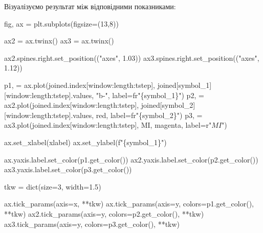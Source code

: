 \documentclass[
  letterpaper,
]{report}
\newenvironment{Shaded}{\begin{snugshade}}{\end{snugshade}}
\newcommand{\BuiltInTok}[1]{\textcolor[rgb]{0.00,0.23,0.31}{#1}}
\newcommand{\DecValTok}[1]{\textcolor[rgb]{0.68,0.00,0.00}{#1}}
\newcommand{\FloatTok}[1]{\textcolor[rgb]{0.68,0.00,0.00}{#1}}
\newcommand{\NormalTok}[1]{\textcolor[rgb]{0.00,0.23,0.31}{#1}}
\newcommand{\OperatorTok}[1]{\textcolor[rgb]{0.37,0.37,0.37}{#1}}
\newcommand{\SpecialCharTok}[1]{\textcolor[rgb]{0.37,0.37,0.37}{#1}}
\newcommand{\SpecialStringTok}[1]{\textcolor[rgb]{0.13,0.47,0.30}{#1}}
\newcommand{\StringTok}[1]{\textcolor[rgb]{0.13,0.47,0.30}{#1}}
\newcommand{\VerbatimStringTok}[1]{\textcolor[rgb]{0.13,0.47,0.30}{#1}}
\begin{document}
Візуалізуємо результат між відповідними показниками:

\begin{Shaded}
\begin{Highlighting}[]
\NormalTok{fig, ax }\OperatorTok{=}\NormalTok{ plt.subplots(figsize}\OperatorTok{=}\NormalTok{(}\DecValTok{13}\NormalTok{,}\DecValTok{8}\NormalTok{))}

\NormalTok{ax2 }\OperatorTok{=}\NormalTok{ ax.twinx()}
\NormalTok{ax3 }\OperatorTok{=}\NormalTok{ ax.twinx()}

\NormalTok{ax2.spines.right.set\_position((}\StringTok{"axes"}\NormalTok{, }\FloatTok{1.03}\NormalTok{))}
\NormalTok{ax3.spines.right.set\_position((}\StringTok{"axes"}\NormalTok{, }\FloatTok{1.12}\NormalTok{))}

\NormalTok{p1, }\OperatorTok{=}\NormalTok{ ax.plot(joined.index[window:length:tstep], }
\NormalTok{                joined[symbol\_1][window:length:tstep].values, }
                \StringTok{"b{-}"}\NormalTok{, }
\NormalTok{                label}\OperatorTok{=}\VerbatimStringTok{fr"}\SpecialCharTok{\{}\NormalTok{symbol\_1}\SpecialCharTok{\}}\VerbatimStringTok{"}\NormalTok{)}
\NormalTok{p2, }\OperatorTok{=}\NormalTok{ ax2.plot(joined.index[window:length:tstep],}
\NormalTok{                joined[symbol\_2][window:length:tstep].values,}
                \StringTok{\textquotesingle{}red\textquotesingle{}}\NormalTok{, }
\NormalTok{                label}\OperatorTok{=}\VerbatimStringTok{fr"}\SpecialCharTok{\{}\NormalTok{symbol\_2}\SpecialCharTok{\}}\VerbatimStringTok{"}\NormalTok{)}
\NormalTok{p3, }\OperatorTok{=}\NormalTok{ ax3.plot(joined.index[window:length:tstep],}
\NormalTok{                MI,}
                \StringTok{\textquotesingle{}magenta\textquotesingle{}}\NormalTok{, }
\NormalTok{                label}\OperatorTok{=}\VerbatimStringTok{r"$MI$"}\NormalTok{)               }


\NormalTok{ax.set\_xlabel(xlabel)}
\NormalTok{ax.set\_ylabel(}\SpecialStringTok{f"}\SpecialCharTok{\{}\NormalTok{symbol\_1}\SpecialCharTok{\}}\SpecialStringTok{"}\NormalTok{)}

\NormalTok{ax.yaxis.label.set\_color(p1.get\_color())}
\NormalTok{ax2.yaxis.label.set\_color(p2.get\_color())}
\NormalTok{ax3.yaxis.label.set\_color(p3.get\_color())}

\NormalTok{tkw }\OperatorTok{=} \BuiltInTok{dict}\NormalTok{(size}\OperatorTok{=}\DecValTok{3}\NormalTok{, width}\OperatorTok{=}\FloatTok{1.5}\NormalTok{)}

\NormalTok{ax.tick\_params(axis}\OperatorTok{=}\StringTok{\textquotesingle{}x\textquotesingle{}}\NormalTok{, }\OperatorTok{**}\NormalTok{tkw)}
\NormalTok{ax.tick\_params(axis}\OperatorTok{=}\StringTok{\textquotesingle{}y\textquotesingle{}}\NormalTok{, colors}\OperatorTok{=}\NormalTok{p1.get\_color(), }\OperatorTok{**}\NormalTok{tkw)}
\NormalTok{ax2.tick\_params(axis}\OperatorTok{=}\StringTok{\textquotesingle{}y\textquotesingle{}}\NormalTok{, colors}\OperatorTok{=}\NormalTok{p2.get\_color(), }\OperatorTok{**}\NormalTok{tkw)}
\NormalTok{ax3.tick\_params(axis}\OperatorTok{=}\StringTok{\textquotesingle{}y\textquotesingle{}}\NormalTok{, colors}\OperatorTok{=}\NormalTok{p3.get\_color(), }\OperatorTok{**}\NormalTok{tkw)}


\end{Highlighting}
\end{Shaded}
\end{document}
